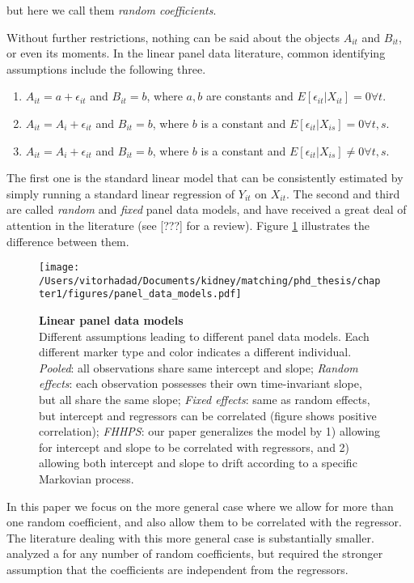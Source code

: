  but here we call them \emph{random coefficients}.

Without further restrictions, nothing can be said about the objects $A_{it}$ and $B_{it}$, or even its moments. In the linear panel data literature, common identifying assumptions include the following three.

\begin{enumerate}
  \item $A_{it} = a + \epsilon_{it}$ and $B_{it} = b$, where $a, b$ are constants and $E[\epsilon_{it}|X_{it}] = 0 \forall t$.
  \item $A_{it} = A_{i} + \epsilon_{it}$ and $B_{it} = b$, where $b$ is a constant and $E[\epsilon_{it}|X_{is}] = 0 \forall t, s$.
  \item $A_{it} = A_{i} + \epsilon_{it}$ and $B_{it} = b$, where $b$ is a constant and $E[\epsilon_{it}|X_{is}] \neq 0 \forall t, s$.
\end{enumerate}

The first one is the standard linear model that can be consistently estimated by simply running a standard linear regression of $Y_{it}$ on $X_{it}$. The second and third are called \emph{random} and \emph{fixed} panel data models, and have received a great deal of attention in the literature (see [???] for a review). Figure \ref{fig:panel_data_models} illustrates the difference between them.


\begin{figure}
  \texttt{[image: /Users/vitorhadad/Documents/kidney/matching/phd\_thesis/chapter1/figures/panel\_data\_models.pdf]}
  \caption[Linear panel data models]{\textbf{Linear panel data models} \\ Different assumptions leading to different panel data models. Each different marker type and color indicates a different individual. \emph{Pooled}: all observations share same intercept and slope; \emph{Random effects}: each observation possesses their own time-invariant slope, but all share the same slope; \emph{Fixed effects}: same as random effects, but intercept and regressors can be correlated (figure shows positive correlation); \emph{FHHPS}: our paper generalizes the model by 1) allowing for intercept and slope to be correlated with regressors, and 2) allowing both intercept and slope to drift according to a specific Markovian process.}
  \label{fig:panel_data_models}
\end{figure}


In this paper we focus on the more general case where we allow for more than one random coefficient, and also allow them to be correlated with the regressor. The literature dealing with this more general case is substantially smaller. \citet{hoderlein2010analyzing} analyzed a for any number of random coefficients, but required the stronger assumption that the coefficients are independent from the regressors. 

